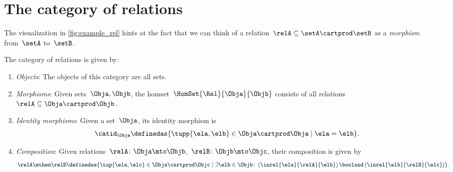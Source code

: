 

\section{The category of relations \Rel}

The visualization in \cref{fig:example_rel} hints at the fact that we can think of a relation~$\relA \subseteq \setA \cartprod \setB$ as a \emph{morphism} from~$\setA$ to~$\setB$.


\begin{ctdefinition}
	\label{def:Rel}
	The category of relations \iindex{\Rel}  is given by:
	\begin{enumerate}
		\item \emph{Objects}: The objects of this category are all sets.
		\item \emph{Morphisms}: Given sets~$\Obja, \Objb$, the homset~$\HomSet{\Rel}{\Obja}{\Objb}$ consists of all relations~$\relA\subseteq \Obja\cartprod \Objb$.
		\item \emph{Identity morphisms}: Given a set~$\Obja$, its identity morphism is
		\begin{equation}
			\catid_\Obja \definedas \{ \tupp{\ela,\elb} \in \Obja \cartprod \Obja \mid  \ela = \elb \}.
		\end{equation}
		\item \emph{Composition}: Given relations~$\relA \colon \Obja\mto \Objb$,~$\relB \colon \Objb\mto \Objc$, their composition is given by
		\begin{equation}
			\label{eq:RelCompRule}
			\relA \mthen \relB \definedas \{\tup{\ela,\elc} \in \Obja \cartprod \Objc \mid  \exists \elb \in \Objb \colon \left(\inrel{\ela}{\relA}{\elb} \right) \booland \left(\inrel{\elb}{\relB}{\elc}\right)\}.
		\end{equation}
	\end{enumerate}
\end{ctdefinition}

